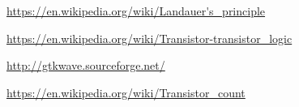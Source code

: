 \begin{thebibliography}{9}

\url{https://en.wikipedia.org/wiki/Landauer's_principle}

\url{https://en.wikipedia.org/wiki/Transistor-transistor_logic}

\url{http://gtkwave.sourceforge.net/}

\url{https://en.wikipedia.org/wiki/Transistor_count}
\end{thebibliography}